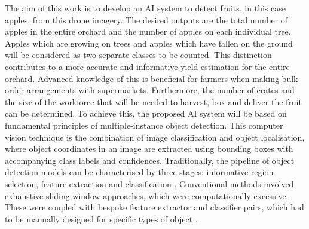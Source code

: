 \documentclass[journal]{IEEEtran}
\begin{document}
The aim of this work is to develop an AI system to detect fruits, in this case apples, from this drone imagery. The desired outputs are the total number of apples in the entire orchard and the number of apples on each individual tree. Apples which are growing on trees and apples which have fallen on the ground will be considered as two separate classes to be counted. 
This distinction contributes to a more accurate and informative yield estimation for the entire orchard. Advanced knowledge of this is beneficial for farmers when making bulk order arrangements with supermarkets. Furthermore, the number of crates and the size of the workforce that will be needed to harvest, box and deliver the fruit can be determined.
To achieve this, the proposed AI system will be based on fundamental principles of multiple-instance object detection. This computer vision technique is the combination of image classification and object localisation, where object coordinates in an image are extracted using bounding boxes with accompanying class labels and confidences. Traditionally, the pipeline of object detection models can be characterised by three stages: informative region selection, feature extraction and classification \cite{detectionreview}.
Conventional methods involved exhaustive sliding window approaches, which were computationally excessive. These were coupled with bespoke feature extractor and classifier pairs, which had to be manually designed for specific types of object \cite{haar, hog}.
\end{document}
